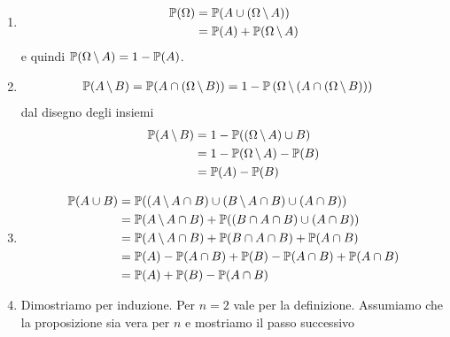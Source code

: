 \documentclass[a4paper]{article}
\begin{document}
\begin{snippetproof}{}
    \begin{enumerate}
        \item
            \begin{align*}
                \mathbb P(\Omega) &= \mathbb P(A \cup (\Omega \,\backslash\, A)) \\
                &= \mathbb P(A) + \mathbb P(\Omega \,\backslash\, A)
            \end{align*}
            e quindi \(\mathbb P(\Omega \,\backslash\, A) = 1- \mathbb P(A)\).
        \item
            \begin{align*}
                \mathbb P(A \,\backslash\, B) &= \mathbb P(A \cap (\Omega \,\backslash\, B)) = 1- \mathbb P\left(\Omega \,\backslash\, (A \cap (\Omega \,\backslash\, B))\right)
            \end{align*}
            dal disegno degli insiemi
            \begin{align*}
                \mathbb P(A \,\backslash\, B) &= 1-\mathbb P((\Omega \,\backslash\, A) \cup B) \\
                &= 1 - \mathbb P(\Omega \,\backslash\, A) - \mathbb P(B) \\
                &= \mathbb P(A) - \mathbb P(B)
            \end{align*}
        \item
            \begin{align*}
                \mathbb P(A \cup B) &= \mathbb P((A \,\backslash\, A \cap B) \cup (B \,\backslash\, A \cap B) \cup (A \cap B)) \\
                &= \mathbb P(A \,\backslash\, A \cap B) + \mathbb P((B \cap A \cap B) \cup (A \cap B)) \\
                &= \mathbb P(A \,\backslash\, A \cap B) + \mathbb P(B \cap A \cap B) + \mathbb P(A \cap B) \\
                &= \mathbb P(A) - \mathbb P(A \cap B) + \mathbb P(B) - \mathbb P(A \cap B) + \mathbb P(A \cap B) \\
                &= \mathbb P(A) + \mathbb P(B) - \mathbb P(A \cap B)
            \end{align*}
        \item Dimostriamo per induzione. Per \(n=2\) vale per la definizione.
            Assumiamo che la proposizione sia vera per \(n\) e mostriamo il passo successivo

\end{enumerate}
\end{snippetproof}
\end{document}
